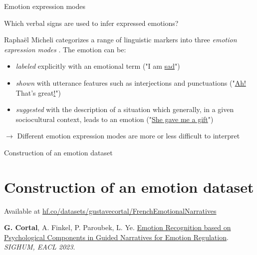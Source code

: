 \documentclass[10pt]{beamer}
\begin{document}
\begin{frame}{Emotion expression modes}

Which verbal signs are used to infer expressed emotions?

\pause
\vspace{0.5cm}

Raphaël Micheli categorizes a range of linguistic markers into three \textit{emotion expression modes} \citep{micheliEsquisseDuneTypologie2013}. The emotion can be: 

\pause
\vspace{0.5cm}

\begin{itemize}[<+->]
    \item \textit{labeled} explicitly with an emotional term ("I am \underline{sad}")
    \item \textit{shown} with utterance features such as interjections and punctuations ("\underline{Ah!} That's great\underline{!}")
    \item \textit{suggested} with the description of a situation which generally, in a given sociocultural context, leads to an emotion ("\underline{She gave me a gift}")
\end{itemize}

\pause
\vspace{0.5cm}

$\rightarrow$ Different emotion expression modes are more or less difficult to interpret
\end{frame}

\begin{frame}{}
\Large
\begin{center}
    Construction of an emotion dataset
    \section{Construction of an emotion dataset}

    \vspace{1.5cm}
\end{center}

\small
Available at \href{https://huggingface.co/datasets/gustavecortal/FrenchEmotionalNarratives}{hf.co/datasets/gustavecortal/FrenchEmotionalNarratives}

\vspace{0.5cm}

\textbf{G. Cortal}, A. Finkel, P. Paroubek, L. Ye. \href{https://aclanthology.org/2023.latechclfl-1.8/}{Emotion Recognition based on Psychological Components in Guided Narratives for Emotion Regulation}. \textit{SIGHUM, EACL 2023}.%
\end{frame}
\end{document}
